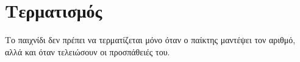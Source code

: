 \documentclass[a4paper,11pt,oneside]{book}
\begin{document}
\section{Τερματισμός}

Το παιχνίδι δεν πρέπει να τερματίζεται μόνο όταν ο παίκτης μαντέψει τον αριθμό, αλλά και όταν τελειώσουν οι προσπάθειές του.











\end{document}
